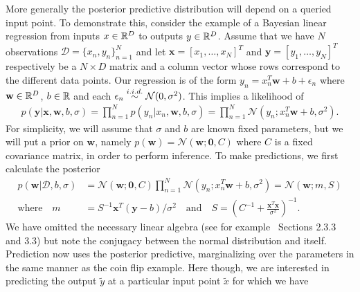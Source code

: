 More generally the posterior predictive distribution will depend on a queried input point.
To demonstrate this, consider the example of a Bayesian linear regression from inputs $x\in\mathbb{R}^D$
to outputs $y\in\mathbb{R}^D$.  Assume that we have $N$ observations $\mathcal{D} = \{x_n,y_n\}_{n=1}^N$
and let $\mathbf{x}=[x_1,\dots,x_N]^T$ and $\mathbf{y}=[y_1,\dots,y_N]^T$ respectively be 
a $N\times D$ matrix and a column vector whose rows correspond to the different data points.
Our regression is of the form $y_n= x_n^T\mathbf{w}+b+\epsilon_n$ where $\mathbf{w}\in\mathbb{R}^D$, $b\in\mathbb{R}$
and each $\epsilon_n \overset{i.i.d.}{\sim} \mathcal{N}(0,\sigma^2)$.  This implies a likelihood of
\begin{align}
\label{eq:bayes:linear-reg-lik}
p(\mathbf{y}|\mathbf{x},\mathbf{w},b,\sigma) = \prod_{n=1}^{N} p(y_n | x_n, \mathbf{w}, b, \sigma) = 
\prod_{n=1}^{N} \mathcal{N}(y_n;x_n^T\mathbf{w}+b,\sigma^2).
\end{align}
For simplicity, we will assume that $\sigma$ and $b$ are known fixed parameters,
but we will put a prior on $\mathbf{w}$, namely $p(\mathbf{w}) = \mathcal{N}(\mathbf{w};\mathbf{0},C)$
where $C$ is a fixed covariance matrix, in order to perform inference.
To make predictions, we first calculate the posterior
\begin{align}
p(\mathbf{w}| \mathcal{D}, b,\sigma) &= \mathcal{N}(\mathbf{w};\mathbf{0},C)
\prod_{n=1}^{N} \mathcal{N}(y_n;x_n^T \mathbf{w}+b,\sigma^2) = \mathcal{N}\left(\mathbf{w} ; m, S\right) \\
\mathrm{where} \quad m &= S^{-1} \mathbf{x}^T \left(\mathbf{y}-b\right)/\sigma^2 \quad
\mathrm{and} \quad S = \left( C^{-1}+\frac{\mathbf{x}^T\mathbf{x}}{\sigma^2}\right)^{-1}. \nonumber
\end{align}
We have omitted the necessary linear algebra (see for example~\cite{bishop2006pattern}
Sections 2.3.3 and 3.3)
but note the conjugacy between
the normal distribution and itself.  Prediction now uses the posterior predictive, marginalizing
over the parameters in the same manner as the coin flip example.  Here though, we are interested
in predicting the output $\tilde{y}$ at a particular input point $\tilde{x}$ for which we have

